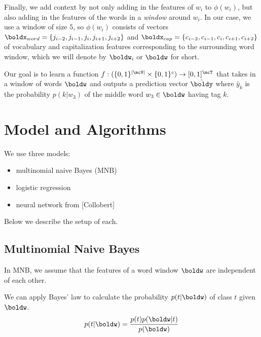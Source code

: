\documentclass[11pt]{article}
\begin{document}
Finally, we add context by not only adding in the features of $w_i$ to $\phi(w_i)$, but also adding in the features of the words in a \emph{window} around $w_i$. In our case, we use a window of size $5$, so $\phi(w_i)$ consists of vectors $\boldx_{word} = \{j_{i-2}, j_{i-1},j_i, j_{i+1}, j_{i+2}\}$ and $\boldx_{cap} = \{c_{i-2}, c_{i-1}, c_i, c_{i+1}, c_{i+2}\}$ of vocabulary and capitalization features corresponding to the surrounding word window, which we will denote by $\boldw_i$ or $\boldw$ for short. 

Our goal is to learn a function $f: (\{0,1\}^{|\mcV|} \times \{0,1\}^c) \to [0,1]^\mcT$ that takes in a window of words $\boldw$ and outputs a prediction vector $\hat{\boldy}$ where $\hat{y}_k$ is the probability $p(k|w_3)$ of the middle word $w_3 \in \boldw$ having tag $k$. 




\section{Model and Algorithms}

We use three models:
\begin{itemize}
  \item multinomial naive Bayes (MNB)
  \item logistic regression
  \item neural network from [Collobert]
\end{itemize}

Below we describe the setup of each.

\subsection{Multinomial Naive Bayes}

In MNB, we assume that the features of a word window $\boldw$ are independent of each other. 

We can apply Bayes' law to calculate the probability $p(t| \boldw)$ of class $t$ given $\boldw$. 
$$p(t| \boldw) = \frac{p(t)p(\boldw |t)}{p(\boldw)}$$
\end{document}
